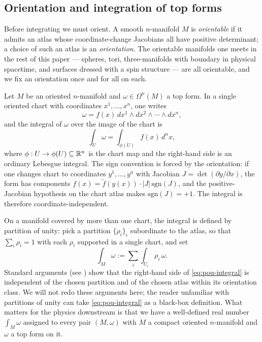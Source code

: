 \subsection{Orientation and integration of top forms}

Before integrating we must orient. A smooth $n$-manifold $M$ is \emph{orientable} if it admits an atlas whose coordinate-change Jacobians all have positive determinant; a choice of such an atlas is an \emph{orientation}. The orientable manifolds one meets in the rest of this paper --- spheres, tori, three-manifolds with boundary in physical spacetime, and surfaces dressed with a spin structure --- are all orientable, and we fix an orientation once and for all on each.

\medskip

\noindent Let $M$ be an oriented $n$-manifold and $\omega \in \Omega^n(M)$ a top form. In a single oriented chart with coordinates $x^1, \ldots, x^n$, one writes
\begin{equation}\label{eq:top-form-local}
\omega = f(x)\,dx^1 \wedge dx^2 \wedge \cdots \wedge dx^n,
\end{equation}
and the integral of $\omega$ over the image of the chart is
\begin{equation}\label{eq:top-form-integral-local}
\int_U \omega = \int_{\phi(U)} f(x)\,d^n x,
\end{equation}
where $\phi: U \to \phi(U) \subseteq \mathbb{R}^n$ is the chart map and the right-hand side is an ordinary Lebesgue integral. The sign convention is forced by the orientation: if one changes chart to coordinates $y^1, \ldots, y^n$ with Jacobian $J = \det(\partial y / \partial x)$, the form has components $f(x) = \tilde f(y(x)) \cdot |J|\, \mathrm{sgn}(J)$, and the positive-Jacobian hypothesis on the chart atlas makes $\mathrm{sgn}(J) = +1$. The integral is therefore coordinate-independent.

\medskip

\noindent On a manifold covered by more than one chart, the integral is defined by partition of unity: pick a partition $\{\rho_i\}_i$ subordinate to the atlas, so that $\sum_i \rho_i = 1$ with each $\rho_i$ supported in a single chart, and set
\begin{equation}\label{eq:pou-integral}
\int_M \omega := \sum_i \int_{U_i} \rho_i\, \omega.
\end{equation}
Standard arguments (see \cite{Nakahara2003GTP}) show that the right-hand side of \eqref{eq:pou-integral} is independent of the chosen partition and of the chosen atlas within its orientation class. We will not redo these arguments here; the reader unfamiliar with partitions of unity can take \eqref{eq:pou-integral} as a black-box definition. What matters for the physics downstream is that we have a well-defined real number $\int_M \omega$ assigned to every pair $(M, \omega)$ with $M$ a compact oriented $n$-manifold and $\omega$ a top form on it.

